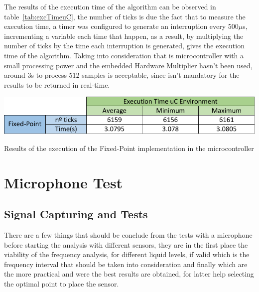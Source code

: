 The results of the execution time of the algorithm can be observed in table~\ref{tab:excTimeuC}, the number of ticks is due the fact that to measure the execution time, a timer was configured to generate an interruption every 500$\mu$s, incrementing a variable each time that happen, as a result, by multiplying the number of ticks by the time each interruption is generated, gives the execution time of the algorithm. Taking into consideration that is microcontroller with a small processing power and the embedded Hardware Multiplier hasn't been used, around 3s to process 512 samples is acceptable, since isn't mandatory for the results to be returned in real-time.  
\begin{table}
    \centering
    \includegraphics[width=1\textwidth]{Chapters/6CHP/Figures/excTimeuC.pdf}
    \caption{Results of the execution of the Fixed-Point implementation in the microcontroller}
    \label{tab:excTimeuC}
\end{table}
\section{Microphone Test}\label{sec:MicroTests}
\subsection{Signal Capturing and Tests}
There are a few things that should be conclude from the tests with a microphone before starting the analysis with different sensors, they are in the first place the viability of the frequency analysis, for different liquid levels, if valid which is the frequency interval that should be taken into consideration and finally which are the more practical and were the best results are obtained, for latter help selecting the optimal point to place the sensor. 

